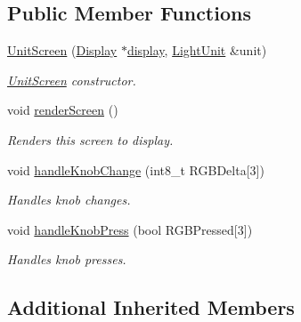 \subsection*{Public Member Functions}
\begin{DoxyCompactItemize}
\item 
\mbox{\hyperlink{classUnitScreen_aec9e9c593e2c59025096fd01529c874b}{Unit\+Screen}} (\mbox{\hyperlink{classDisplay}{Display}} $\ast$\mbox{\hyperlink{classScreen_aad713267725e8aa8a8def951a07de641}{display}}, \mbox{\hyperlink{classLightUnit}{Light\+Unit}} \&unit)
\begin{DoxyCompactList}\small\item\em \mbox{\hyperlink{classUnitScreen}{Unit\+Screen}} constructor. \end{DoxyCompactList}\item 
\mbox{\label{classUnitScreen_aa6baad6ccef6da111a44d763de359bb8}} 
void \mbox{\hyperlink{classUnitScreen_aa6baad6ccef6da111a44d763de359bb8}{render\+Screen}} ()
\begin{DoxyCompactList}\small\item\em Renders this screen to display. \end{DoxyCompactList}\item 
\mbox{\label{classUnitScreen_a4eea15b5c63c97c5a072b151cfa05e84}} 
void \mbox{\hyperlink{classUnitScreen_a4eea15b5c63c97c5a072b151cfa05e84}{handle\+Knob\+Change}} (int8\+\_\+t R\+G\+B\+Delta\mbox{[}3\mbox{]})
\begin{DoxyCompactList}\small\item\em Handles knob changes. \end{DoxyCompactList}\item 
\mbox{\label{classUnitScreen_a45956efc8827ebfdddaf83d7c44db135}} 
void \mbox{\hyperlink{classUnitScreen_a45956efc8827ebfdddaf83d7c44db135}{handle\+Knob\+Press}} (bool R\+G\+B\+Pressed\mbox{[}3\mbox{]})
\begin{DoxyCompactList}\small\item\em Handles knob presses. \end{DoxyCompactList}\end{DoxyCompactItemize}
\subsection*{Additional Inherited Members}


